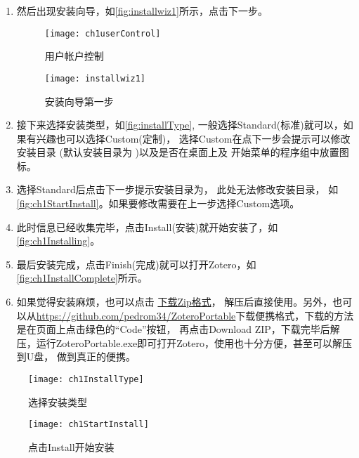 \documentclass[cn,11pt,chinese]{elegantbook}
\begin{document}
\begin{enumerate}
			\item 然后出现安装向导，如\autoref{fig:installwiz1}所示，点击下一步。
				\begin{figure}[htbp]
					\centering
					\begin{minipage}[t]{\dimexpr0.5\textwidth-4em}
						\centering
						\texttt{[image: ch1userControl]}
						\caption{用户帐户控制}
						\label{fig:userControl}
					\end{minipage}
					\hspace{1em}		
					\begin{minipage}[t]{\dimexpr0.5\textwidth-4em}
						\centering
						\texttt{[image: installwiz1]}
						\caption{安装向导第一步}
						\label{fig:installwiz1}
					\end{minipage}
				\end{figure}
			\item 接下来选择安装类型，如\autoref{fig:installType},
			一般选择Standard(标准)就可以，如果有兴趣也可以选择Custom(定制)，
			选择Custom在点下一步会提示可以修改安装目录
			(默认安装目录为 )以及是否在桌面上及
			开始菜单的程序组中放置图标。
			\item 选择Standard后点击下一步提示安装目录为，
			此处无法修改安装目录，
			如\autoref{fig:ch1StartInstall}。如果要修改需要在上一步选择Custom选项。
			\item 此时信息已经收集完毕，点击Install(安装)就开始安装了，如\autoref{fig:ch1Installing}。
			\item 最后安装完成，点击Finish(完成)就可以打开Zotero，如\autoref{fig:ch1InstallComplete}所示。
			\item 如果觉得安装麻烦，也可以点击
			\href{https://www.zotero.org/download/client/dl?channel=release&platform=win32-zip}{下载Zip格式}，
			解压后直接使用。另外，也可以从\href{https://github.com/pedrom34/ZoteroPortable}
			{https://github.com/pedrom34/ZoteroPortable}下载便携格式，下载的方法是在页面上点击绿色的“Code”按钮，
			再点击Download ZIP，下载完毕后解压，运行ZoteroPortable.exe即可打开Zotero，使用也十分方便，甚至可以解压到U盘，
			做到真正的便携。

	\end{enumerate}
		
			\begin{figure}[htbp]
				
				\begin{minipage}[t]{\dimexpr0.5\textwidth-4em}
					\centering
					\texttt{[image: ch1InstallType]}
					\caption{选择安装类型}
					\label{fig:installType}
				\end{minipage}
				\hspace{1cm}	
				\begin{minipage}[t]{\dimexpr0.5\textwidth-4em}
					\centering
					\texttt{[image: ch1StartInstall]}
					\caption{点击Install开始安装}
					\label{fig:ch1StartInstall}
				\end{minipage}
				
			\end{figure}	
		
\end{document}
